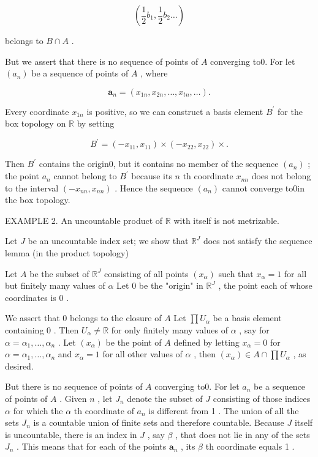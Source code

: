 \documentclass[10pt]{article}
\begin{document}
\[
\left( {\frac{1}{2}{b}_{1},\frac{1}{2}{b}_{2}\ldots }\right)
\]

belongs to \(B \cap  A\) .

But we assert that there is no sequence of points of \(A\) converging to0. For let \(\left( {a}_{n}\right)\) be a sequence of points of \(A\) , where

\[
{\mathbf{a}}_{n} = \left( {{x}_{1n},{x}_{2n},\ldots ,{x}_{tn},\ldots }\right) .
\]

Every coordinate \({x}_{1n}\) is positive, so we can construct a basis element \({B}^{\prime }\) for the box topology on \(\mathbb{R}\) by setting

\[
{B}^{\prime } = \left( {-{x}_{11},{x}_{11}}\right)  \times  \left( {-{x}_{22},{x}_{22}}\right)  \times  .
\]

Then \({B}^{\prime }\) contains the origin0, but it contains no member of the sequence \(\left( {a}_{n}\right)\) ; the point \({a}_{n}\) cannot belong to \({B}^{\prime }\) because its \(n\) th coordinate \({x}_{nn}\) does not belong to the interval \(\left( {-{x}_{nn},{x}_{nn}}\right)\) . Hence the sequence \(\left( {a}_{n}\right)\) cannot converge to0in the box topology.

EXAMPLE 2. An uncountable product of \(\mathbb{R}\) with itself is not metrizable.

Let \(J\) be an uncountable index set; we show that \({\mathbb{R}}^{J}\) does not satisfy the sequence lemma (in the product topology)

Let \(A\) be the subset of \({\mathbb{R}}^{J}\) consisting of all points \(\left( {x}_{\alpha }\right)\) such that \({x}_{\alpha } = 1\) for all but finitely many values of \(\alpha\) Let 0 be the "origin" in \({\mathbb{R}}^{J}\) , the point each of whose coordinates is 0 .

We assert that 0 belongs to the closure of \(A\) Let \(\prod {U}_{\alpha }\) be a basis element containing 0 . Then \({U}_{\alpha } \neq  \mathbb{R}\) for only finitely many values of \(\alpha\) , say for \(\alpha  = {\alpha }_{1},\ldots ,{\alpha }_{n}\) . Let \(\left( {x}_{\alpha }\right)\) be the point of \(A\) defined by letting \({x}_{\alpha } = 0\) for \(\alpha  = {\alpha }_{1},\ldots ,{\alpha }_{n}\) and \({x}_{\alpha } = 1\) for all other values of \(\alpha\) , then \(\left( {x}_{\alpha }\right)  \in  A \cap  \prod {U}_{\alpha }\) , as desired.

But there is no sequence of points of \(A\) converging to0. For let \({a}_{n}\) be a sequence of points of \(A\) . Given \(n\) , let \({J}_{n}\) denote the subset of \(J\) consisting of those indices \(\alpha\) for which the \(\alpha\) th coordinate of \({a}_{n}\) is different from 1 . The union of all the sets \({J}_{n}\) is a countable union of finite sets and therefore countable. Because \(J\) itself is uncountable, there is an index in \(J\) , say \(\beta\) , that does not lie in any of the sets \({J}_{n}\) . This means that for each of the points \({\mathbf{a}}_{n}\) , its \(\beta\) th coordinate equals 1 .
\end{document}
